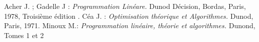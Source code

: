 \documentclass[a4paper,11pt,oneside]{report}
\theoremstyle{plain}
\newcommand{\0}{/ \! \! \! 0}
\theoremstyle{plain}
\begin{document}

\begin{thebibliography}{10}

Acher J. ; Gadelle J : 
\emph{Programmation Lin\'eare.} 
Dunod D\'ecision, Bordas, Paris, 1978, Troisi\`eme \'edition .
C\'ea J. : 
\emph{Optimisation th\'eorique et Algorithmes.}
Dunod, Paris, 1971.
Minoux M.:
\emph{Programmation lin\'eaire, th\'eorie et algorithmes.}
Dunond, Tomes 1 et 2


\end{thebibliography}
\end{document}
